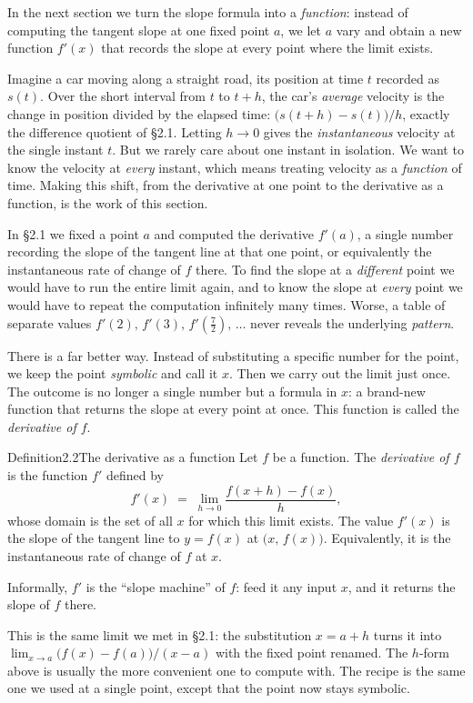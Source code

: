 \documentclass[a4paper,12pt,oneside]{memoir}
\begin{document}
In the next section we turn the slope formula into a \emph{function}: instead of computing the tangent slope at one fixed point \(a\), we let \(a\) vary and obtain a new function \(f'(x)\) that records the slope at every point where the limit exists.


Imagine a car moving along a straight road, its position at time \(t\) recorded as \(s(t)\). Over the short interval from \(t\) to \(t + h\), the car’s \emph{average} velocity is the change in position divided by the elapsed time: \(\bigl(s(t+h) - s(t)\bigr)/h\), exactly the difference quotient of §2.1. Letting \(h \to 0\) gives the \emph{instantaneous} velocity at the single instant \(t\). But we rarely care about one instant in isolation. We want to know the velocity at \emph{every} instant, which means treating velocity as a \emph{function} of time. Making this shift, from the derivative at one point to the derivative as a function, is the work of this section.

In §2.1 we fixed a point \(a\) and computed the derivative \(f'(a)\), a single number recording the slope of the tangent line at that one point, or equivalently the instantaneous rate of change of \(f\) there. To find the slope at a \emph{different} point we would have to run the entire limit again, and to know the slope at \emph{every} point we would have to repeat the computation infinitely many times. Worse, a table of separate values \(f'(2),\, f'(3),\, f'(\tfrac{7}{2}),\, \ldots\) never reveals the underlying \emph{pattern}.

There is a far better way. Instead of substituting a specific number for the point, we keep the point \emph{symbolic} and call it \(x\). Then we carry out the limit just once. The outcome is no longer a single number but a formula in \(x\): a brand-new function that returns the slope at every point at once. This function is called the \emph{derivative of \(f\)}.

\begin{envdefinition}{Definition}{2.2}{The derivative as a function}
Let \(f\) be a function. The \emph{derivative of \(f\)} is the function \(f'\) defined by \[ f'(x) \;=\; \lim_{h \to 0} \frac{f(x + h) - f(x)}{h}, \] whose domain is the set of all \(x\) for which this limit exists. The value \(f'(x)\) is the slope of the tangent line to \(y = f(x)\) at \(\bigl(x,\, f(x)\bigr)\). Equivalently, it is the instantaneous rate of change of \(f\) at \(x\).

\begin{informal}
Informally, \(f'\) is the “slope machine” of \(f\): feed it any input \(x\), and it returns the slope of \(f\) there.
\end{informal}
\end{envdefinition}
This is the same limit we met in §2.1: the substitution \(x = a + h\) turns it into \(\lim_{x \to a}\bigl(f(x) - f(a)\bigr)/(x - a)\) with the fixed point renamed. The \(h\)-form above is usually the more convenient one to compute with. The recipe is the same one we used at a single point, except that the point now stays symbolic.
\end{document}
